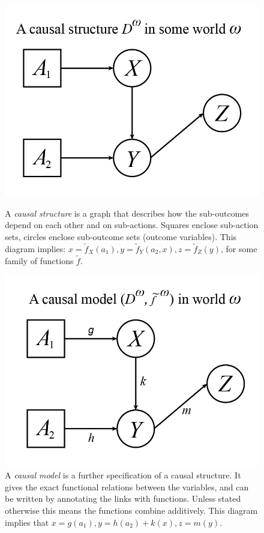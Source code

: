 \begin{figure}[h]
	\centering
	\begin{minipage}[t]{0.5\textwidth}\ContinuedFloat*
		\centering
		\captionsetup{labelfont=bf,font=small,labelsep=period}
		\includegraphics[width=0.7\linewidth]{"images/diagramexplanations/1-causalstructure"}
		\caption{\rightskip=10pt\leftskip=10pt A \textit{causal structure} is a graph that describes how the sub-outcomes depend on each other and on sub-actions. Squares enclose sub-action sets, circles enclose sub-outcome sets (outcome variables). This diagram implies: $x=\tilde f_X(a_1),y=\tilde f_Y(a_2,x),z=\tilde f_Z(y)$, for some family of functions $\tilde f$.}
		\label{fig:1-causalstructure}
	\end{minipage}\hfill
	\begin{minipage}[t]{0.5\textwidth}\ContinuedFloat
		\centering
		\captionsetup{labelfont=bf,font=small,labelsep=period}
		\includegraphics[width=0.7\linewidth]{"images/diagramexplanations/2-causalmodel"}
		\caption{\rightskip=10pt\leftskip=10pt A \textit{causal model} is a further specification of a causal structure. It gives the exact functional relations between the variables, and can be written by annotating the links with functions. Unless stated otherwise this means the functions combine additively. This diagram implies that $x=g(a_1),y=h(a_2)+k(x),z=m(y)$.}
		\label{fig:2-causalmodel}
	\end{minipage}\hfill
\end{figure}




